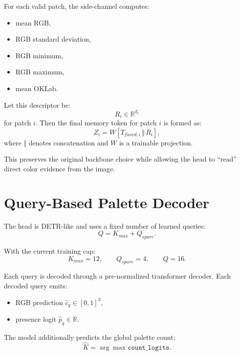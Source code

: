 \documentclass[11pt,a4paper]{article}
\begin{document}
For each valid patch, the side-channel computes:
\begin{itemize}[leftmargin=2em]
    \item mean RGB,
    \item RGB standard deviation,
    \item RGB minimum,
    \item RGB maximum,
    \item mean OKLab.
\end{itemize}

Let this descriptor be:
\begin{equation}
R_i \in \mathbb{R}^{d_r}
\end{equation}
for patch $i$. Then the final memory token for patch $i$ is formed as:
\begin{equation}
Z_i = W \left[ T_{fused,i} \, \Vert \, R_i \right],
\end{equation}
where $\Vert$ denotes concatenation and $W$ is a trainable projection.

This preserves the original backbone choice while allowing the head to ``read'' direct color evidence from the image.

\section{Query-Based Palette Decoder}

The head is DETR-like and uses a fixed number of learned queries:
\begin{equation}
Q = K_{max} + Q_{spare}.
\end{equation}

With the current training cap:
\begin{equation}
K_{max}=12, \qquad Q_{spare}=4, \qquad Q=16.
\end{equation}

Each query is decoded through a pre-normalized transformer decoder. Each decoded query emits:
\begin{itemize}[leftmargin=2em]
    \item RGB prediction $\hat{c}_q \in [0,1]^3$,
    \item presence logit $\hat{p}_q \in \mathbb{R}$.
\end{itemize}

The model additionally predicts the global palette count:
\begin{equation}
\hat{K} = \arg\max \texttt{count\_logits}.
\end{equation}
\end{document}
